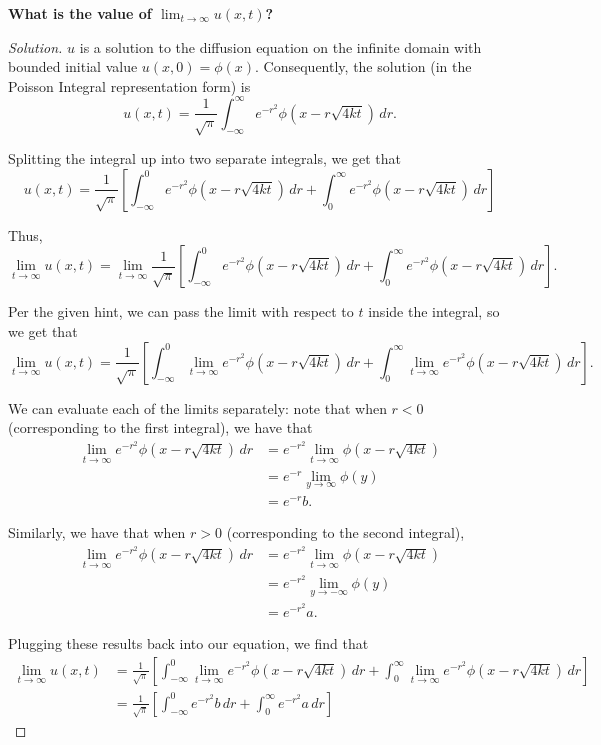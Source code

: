 \documentclass[11pt]{article}
\newenvironment{solution}
  {\renewcommand\qedsymbol{$\blacksquare$}\begin{proof}[Solution]}
  {\end{proof}}
\begin{document}
\begin{enumerate}
\begin{enumerate}
\textbf{What is the value of $\lim_{t\rightarrow \infty} u(x, t)$?}

\begin{solution}
$u$ is a solution to the diffusion equation on the infinite domain with bounded initial value $u(x, 0) = \phi(x)$. Consequently, the solution (in the Poisson Integral representation form) is 
\[ u(x, t) = \frac{1}{\sqrt{\pi}} \int_{-\infty}^{\infty} e^{-r^2} \phi(x-r\sqrt{4kt}) \, dr.\]

Splitting the integral up into two separate integrals, we get that
\[ u(x, t) = \frac{1}{\sqrt{\pi}} \left[\int_{-\infty}^{0} e^{-r^2} \phi(x-r\sqrt{4kt}) \, dr + \int_{0}^{\infty} e^{-r^2} \phi(x-r\sqrt{4kt}) \, dr \right] \]

Thus, \[ \lim_{t \rightarrow \infty} u(x, t) = \lim_{t \rightarrow \infty} \frac{1}{\sqrt{\pi}} \left[\int_{-\infty}^{0} e^{-r^2} \phi(x-r\sqrt{4kt}) \, dr + \int_{0}^{\infty} e^{-r^2} \phi(x-r\sqrt{4kt}) \, dr \right]. \]

Per the given hint, we can pass the limit with respect to $t$ inside the integral, so we get that
\[ \lim_{t \rightarrow \infty} u(x, t) = \frac{1}{\sqrt{\pi}} \left[\int_{-\infty}^{0} \lim_{t \rightarrow \infty} e^{-r^2} \phi(x-r\sqrt{4kt}) \, dr + \int_{0}^{\infty} \lim_{t \rightarrow \infty} e^{-r^2} \phi(x-r\sqrt{4kt}) \, dr \right]. \]

We can evaluate each of the limits separately: note that when $r < 0$ (corresponding to the first integral), we have that
\begin{align*}\lim_{t \rightarrow \infty} e^{-r^2} \phi(x-r\sqrt{4kt}) \, dr &= e^{-r^2} \lim_{t \rightarrow \infty} \phi(x-r\sqrt{4kt}) \\
&= e^{-r} \lim_{y \rightarrow \infty} \phi(y) \\
&= e^{-r} b.\end{align*}

Similarly, we have that when $r > 0$ (corresponding to the second integral),
\begin{align*}\lim_{t \rightarrow \infty} e^{-r^2} \phi(x-r\sqrt{4kt}) \, dr &= e^{-r^2} \lim_{t \rightarrow \infty} \phi(x-r\sqrt{4kt}) \\
	&= e^{-r^2} \lim_{y \rightarrow -\infty} \phi(y) \\
	&= e^{-r^2} a.\end{align*}

Plugging these results back into our equation, we find that
\begin{align*} \lim_{t \rightarrow \infty} u(x, t) &= \frac{1}{\sqrt{\pi}} \left[\int_{-\infty}^{0} \lim_{t \rightarrow \infty} e^{-r^2} \phi(x-r\sqrt{4kt}) \, dr + \int_{0}^{\infty} \lim_{t \rightarrow \infty} e^{-r^2} \phi(x-r\sqrt{4kt}) \, dr \right] \\
&= 	\frac{1}{\sqrt{\pi}} \left[\int_{-\infty}^{0} e^{-r^2} b \, dr + \int_{0}^{\infty} e^{-r^2} a  \, dr  \right]
\end{align*}


\end{solution}
\end{enumerate}
\end{enumerate}
\end{document}
